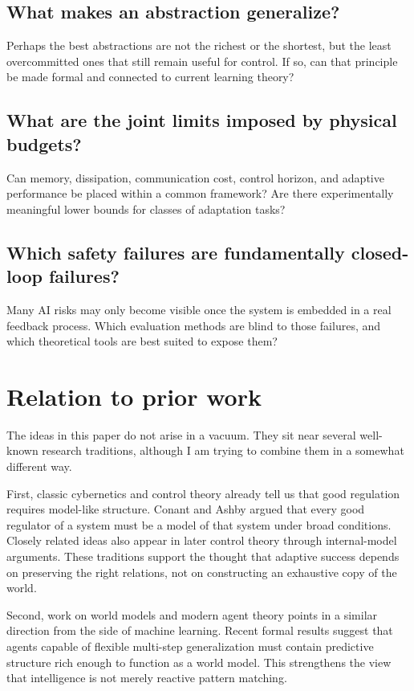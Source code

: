 \documentclass[11pt]{article}
\begin{document}
\subsection{What makes an abstraction generalize?}

Perhaps the best abstractions are not the richest or the shortest, but the least overcommitted ones that still remain useful for control. If so, can that principle be made formal and connected to current learning theory?

\subsection{What are the joint limits imposed by physical budgets?}

Can memory, dissipation, communication cost, control horizon, and adaptive performance be placed within a common framework? Are there experimentally meaningful lower bounds for classes of adaptation tasks?

\subsection{Which safety failures are fundamentally closed-loop failures?}

Many AI risks may only become visible once the system is embedded in a real feedback process. Which evaluation methods are blind to those failures, and which theoretical tools are best suited to expose them?

\section{Relation to prior work}


The ideas in this paper do not arise in a vacuum. They sit near several well-known research traditions, although I am trying to combine them in a somewhat different way.

First, classic cybernetics and control theory already tell us that good regulation requires model-like structure. Conant and Ashby argued that every good regulator of a system must be a model of that system under broad conditions. Closely related ideas also appear in later control theory through internal-model arguments. These traditions support the thought that adaptive success depends on preserving the right relations, not on constructing an exhaustive copy of the world.

Second, work on world models and modern agent theory points in a similar direction from the side of machine learning. Recent formal results suggest that agents capable of flexible multi-step generalization must contain predictive structure rich enough to function as a world model. This strengthens the view that intelligence is not merely reactive pattern matching.
\end{document}
